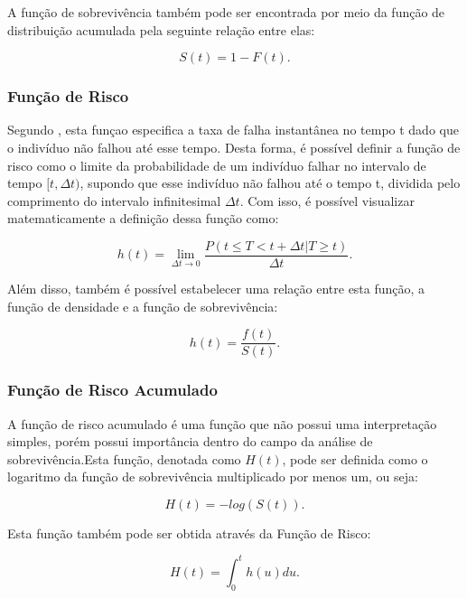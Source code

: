 \documentclass[a4paper,12pt]{article}
\begin{document}
A função de sobrevivência também pode ser encontrada por meio da função de distribuição acumulada pela seguinte relação entre elas:

\begin{equation*}
S(t) = 1 - F(t).
\end{equation*}

\subsubsection{Função de Risco}

Segundo \cite{Lawless}, esta funçao especifica a taxa de falha instantânea no tempo t dado que o indivíduo não falhou até esse tempo. Desta forma, é possível definir a função de risco como o limite da probabilidade de um indivíduo falhar no intervalo de tempo $[t, \Delta t)$, supondo que esse indivíduo não falhou até o tempo t, dividida pelo comprimento do intervalo infinitesimal $\Delta t$. Com isso, é possível visualizar matematicamente a definição dessa função como:

\begin{equation} \label{eq:haz}
h(t) = \lim_{\Delta t \to 0}\dfrac{P(t \le T < t+\Delta t|T\ge t)}{\Delta t}.
\end{equation}

Além disso, também é possível estabelecer uma relação entre esta função, a função de densidade e a função de sobrevivência:

\begin{equation} \label{eq:haz_surv}
h(t) = \dfrac{f(t)}{S(t)}.
\end{equation}


\subsubsection{Função de Risco Acumulado}

A função de risco acumulado é uma função que não possui uma interpretação simples, porém possui importância dentro do campo da análise de sobrevivência.Esta função, denotada como $H(t)$, pode ser definida como o logaritmo da função de sobrevivência multiplicado por menos um, ou seja:

\begin{equation} \label{eq:riskcum}
 H(t) = -log(S(t)).
\end{equation}

Esta função também pode ser obtida através da Função de Risco:

\begin{equation} \label{eq:riskcum}
 H(t) = \int_0^t h(u)du.
\end{equation}
\end{document}

